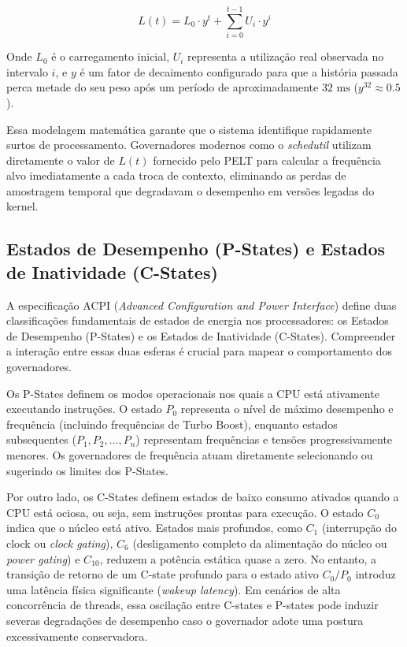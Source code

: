 \documentclass[12pt]{article}
\begin{document}
\begin{equation}
L(t) = L_0 \cdot y^t + \sum_{i=0}^{t-1} U_i \cdot y^i
\end{equation}

Onde $L_0$ é o carregamento inicial, $U_i$ representa a utilização real observada no intervalo $i$, e $y$ é um fator de decaimento configurado para que a história passada perca metade do seu peso após um período de aproximadamente $32\text{ ms}$ ($y^{32} \approx 0.5$). 

Essa modelagem matemática garante que o sistema identifique rapidamente surtos de processamento. Governadores modernos como o \textit{schedutil} utilizam diretamente o valor de $L(t)$ fornecido pelo PELT para calcular a frequência alvo imediatamente a cada troca de contexto, eliminando as perdas de amostragem temporal que degradavam o desempenho em versões legadas do kernel.

\subsection{Estados de Desempenho (P-States) e Estados de Inatividade (C-States)}

A especificação ACPI (\textit{Advanced Configuration and Power Interface}) define duas classificações fundamentais de estados de energia nos processadores: os Estados de Desempenho (P-States) e os Estados de Inatividade (C-States). Compreender a interação entre essas duas esferas é crucial para mapear o comportamento dos governadores.

Os P-States definem os modos operacionais nos quais a CPU está ativamente executando instruções. O estado $P_0$ representa o nível de máximo desempenho e frequência (incluindo frequências de Turbo Boost), enquanto estados subsequentes ($P_1, P_2, \dots, P_n$) representam frequências e tensões progressivamente menores. Os governadores de frequência atuam diretamente selecionando ou sugerindo os limites dos P-States.

Por outro lado, os C-States definem estados de baixo consumo ativados quando a CPU está ociosa, ou seja, sem instruções prontas para execução. O estado $C_0$ indica que o núcleo está ativo. Estados mais profundos, como $C_1$ (interrupção do clock ou \textit{clock gating}), $C_6$ (desligamento completo da alimentação do núcleo ou \textit{power gating}) e $C_{10}$, reduzem a potência estática quase a zero. No entanto, a transição de retorno de um C-state profundo para o estado ativo $C_0/P_0$ introduz uma latência física significante (\textit{wakeup latency}). Em cenários de alta concorrência de threads, essa oscilação entre C-states e P-states pode induzir severas degradações de desempenho caso o governador adote uma postura excessivamente conservadora.
\end{document}
